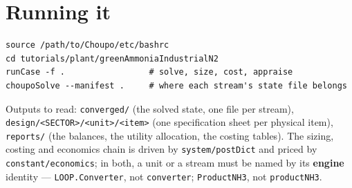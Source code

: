 \documentclass[11pt,a4paper]{article}
\begin{document}
\section{Running it}

\begin{verbatim}
source /path/to/Choupo/etc/bashrc
cd tutorials/plant/greenAmmoniaIndustrialN2
runCase -f .                 # solve, size, cost, appraise
choupoSolve --manifest .     # where each stream's state file belongs
\end{verbatim}

Outputs to read: \texttt{converged/} (the solved state, one file per stream),
\texttt{design/\allowbreak{}<SECTOR>/\allowbreak{}<unit>/\allowbreak{}<item>} (one specification sheet per physical
item), \texttt{reports/} (the balances, the utility allocation, the costing
tables). The sizing, costing and economics chain is driven by
\texttt{system/postDict} and priced by \texttt{constant/economics}; in both,
a unit or a stream must be named by its \textbf{engine} identity ---
\texttt{LOOP.Converter}, not \texttt{converter}; \texttt{ProductNH3}, not
\texttt{productNH3}.
\end{document}
